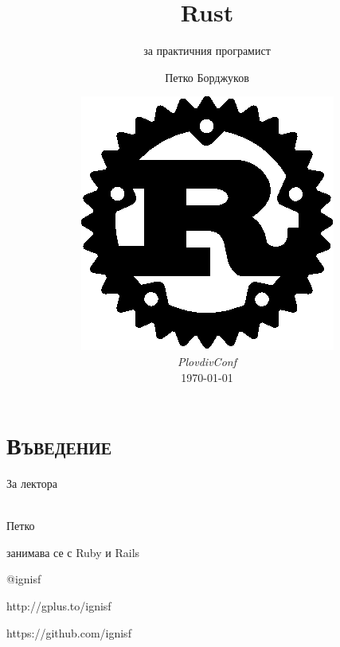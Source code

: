 \documentclass[xcolor=x11names,compress]{beamer}
\renewcommand{\(}{\begin{columns}}
\renewcommand{\)}{\end{columns}}
\newcommand{\<}[1]{\begin{column}{#1}}
\renewcommand{\>}{\end{column}}
\begin{document}
\section{\scshape Въведение}
\begin{frame}
\title{\textbf{Rust}}
\subtitle{за практичния програмист}
\author{Петко Борджуков}
\date{
  \includegraphics[scale=0.6]{Rust}  
  \\
  \vspace{1cm}
  {\it PlovdivConf} \\
  \tiny\today
}
\titlepage
\end{frame}

\begin{frame}{За лектора}
  \begin{center}
    \setlength\fboxsep{2pt}
    \setlength\fboxrule{0.3pt}
     \\
    Петко

    \pause
    занимава се с Ruby и Rails \pause \Heart

    \vspace{1cm}
    \pause
    @ignisf

    \pause
    http://gplus.to/ignisf

    \pause
    https://github.com/ignisf
  \end{center}
\end{frame}
\end{document}
